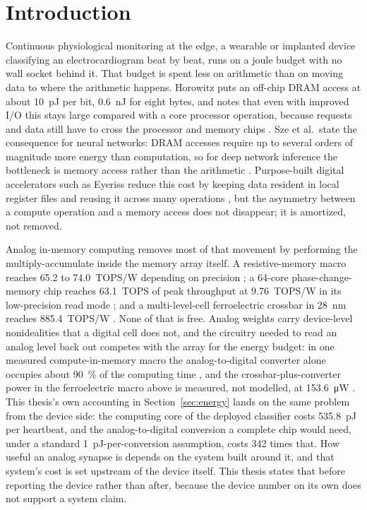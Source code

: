 \section{Introduction}
\label{sec:intro}

Continuous physiological monitoring at the edge, a wearable or implanted device
classifying an electrocardiogram beat by beat, runs on a joule budget with no wall
socket behind it. That budget is spent less on arithmetic than on moving data to
where the arithmetic happens. Horowitz puts an off-chip DRAM access at about
\SI{10}{\pico\joule} per bit, \SI{0.6}{\nano\joule} for eight bytes, and notes that
even with improved I/O this stays large compared with a core processor operation,
because requests and data still have to cross the processor and memory chips
\cite{Horowitz2014_ISSCC}. Sze et al.\ state the consequence for neural networks:
DRAM accesses require up to several orders of magnitude more energy than
computation, so for deep network inference the bottleneck is memory access rather
than the arithmetic \cite{Sze2017_ProcIEEE}. Purpose-built digital accelerators such
as Eyeriss reduce this cost by keeping data resident in local register files and
reusing it across many operations \cite{Chen2016_JSSC}, but the asymmetry between a
compute operation and a memory access does not disappear; it is amortized, not
removed.

Analog in-memory computing removes most of that movement by performing the
multiply-accumulate inside the memory array itself. A resistive-memory macro reaches
\num{65.2} to \num{74.0}~TOPS/W depending on precision \cite{Wan2022_Nature}; a
64-core phase-change-memory chip reaches \num{63.1}~TOPS of peak throughput at
\num{9.76}~TOPS/W in its low-precision read mode \cite{LeGallo2023_NatElectron}; and
a multi-level-cell ferroelectric crossbar in 28~nm reaches \num{885.4}~TOPS/W
\cite{Soliman2023_NatComm}. None of that is free. Analog weights carry device-level
nonidealities that a digital cell does not, and the circuitry needed to read an
analog level back out competes with the array for the energy budget: in one measured
compute-in-memory macro the analog-to-digital converter alone occupies about
\SI{90}{\percent} of the computing time \cite{Fu2024_JSSC}, and the
crossbar-plus-converter power in the ferroelectric macro above is measured, not
modelled, at \SI{153.6}{\micro\watt} \cite{Soliman2023_NatComm}. This thesis's own
accounting in Section~\ref{sec:energy} lands on the same problem from the device
side: the computing core of the deployed classifier costs \SI{535.8}{\pico\joule}
per heartbeat, and the analog-to-digital conversion a complete chip would need,
under a standard \SI{1}{\pico\joule}-per-conversion assumption, costs \num{342}
times that. How useful an analog synapse is depends on the system built around it,
and that system's cost is set upstream of the device itself. This thesis states that
before reporting the device rather than after, because the device number on its own
does not support a system claim.

